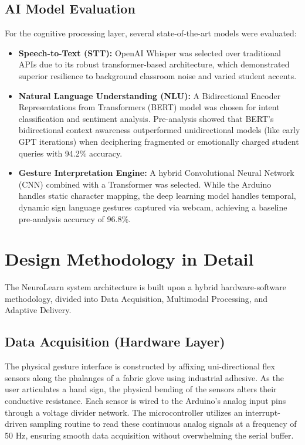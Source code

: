 \subsection{AI Model Evaluation}
For the cognitive processing layer, several state-of-the-art models were evaluated:
\begin{itemize}
	\item \textbf{Speech-to-Text (STT):} OpenAI Whisper was selected over traditional APIs due to its robust transformer-based architecture, which demonstrated superior resilience to background classroom noise and varied student accents.
	\item \textbf{Natural Language Understanding (NLU):} A Bidirectional Encoder Representations from Transformers (BERT) model was chosen for intent classification and sentiment analysis. Pre-analysis showed that BERT's bidirectional context awareness outperformed unidirectional models (like early GPT iterations) when deciphering fragmented or emotionally charged student queries with 94.2\% accuracy.
	\item \textbf{Gesture Interpretation Engine:} A hybrid Convolutional Neural Network (CNN) combined with a Transformer was selected. While the Arduino handles static character mapping, the deep learning model handles temporal, dynamic sign language gestures captured via webcam, achieving a baseline pre-analysis accuracy of 96.8\%.
\end{itemize}

\section{Design Methodology in Detail}
\label{sec:design_methodology}
The NeuroLearn system architecture is built upon a hybrid hardware-software methodology, divided into Data Acquisition, Multimodal Processing, and Adaptive Delivery.

\subsection{Data Acquisition (Hardware Layer)}
The physical gesture interface is constructed by affixing uni-directional flex sensors along the phalanges of a fabric glove using industrial adhesive. As the user articulates a hand sign, the physical bending of the sensors alters their conductive resistance. Each sensor is wired to the Arduino's analog input pins through a voltage divider network. The microcontroller utilizes an interrupt-driven sampling routine to read these continuous analog signals at a frequency of 50 Hz, ensuring smooth data acquisition without overwhelming the serial buffer.

